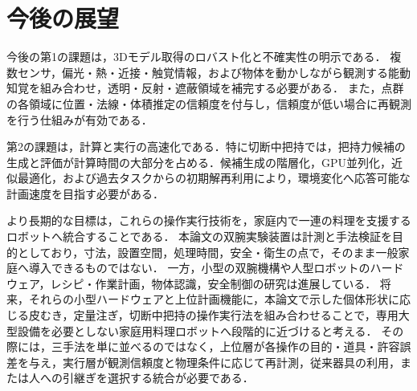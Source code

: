 \section{今後の展望}
\label{sec:conclusion_future}

今後の第1の課題は，3Dモデル取得のロバスト化と不確実性の明示である．
複数センサ，偏光・熱・近接・触覚情報，および物体を動かしながら観測する能動知覚を組み合わせ，透明・反射・遮蔽領域を補完する必要がある．
また，点群の各領域に位置・法線・体積推定の信頼度を付与し，信頼度が低い場合に再観測を行う仕組みが有効である．

第2の課題は，計算と実行の高速化である．特に切断中把持では，把持力候補の生成と評価が計算時間の大部分を占める．候補生成の階層化，GPU並列化，近似最適化，および過去タスクからの初期解再利用により，環境変化へ応答可能な計画速度を目指す必要がある．

\begin{revisionblock}
より長期的な目標は，これらの操作実行技術を，家庭内で一連の料理を支援するロボットへ統合することである．
本論文の双腕実験装置は計測と手法検証を目的としており，寸法，設置空間，処理時間，安全・衛生の点で，そのまま一般家庭へ導入できるものではない．
一方，小型の双腕機構や人型ロボットのハードウェア，レシピ・作業計画，物体認識，安全制御の研究は進展している．
将来，それらの小型ハードウェアと上位計画機能に，本論文で示した個体形状に応じる皮むき，定量注ぎ，切断中把持の操作実行法を組み合わせることで，専用大型設備を必要としない家庭用料理ロボットへ段階的に近づけると考える．
その際には，三手法を単に並べるのではなく，上位層が各操作の目的・道具・許容誤差を与え，実行層が観測信頼度と物理条件に応じて再計測，従来器具の利用，または人への引継ぎを選択する統合が必要である．
\end{revisionblock}


